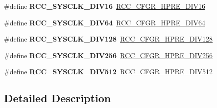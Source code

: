 \begin{DoxyCompactItemize}
\#define {\bfseries R\+C\+C\+\_\+\+S\+Y\+S\+C\+L\+K\+\_\+\+D\+I\+V16}~\hyperlink{group___peripheral___registers___bits___definition_ga3806da4f1afc9e5be0fca001c8c57815}{R\+C\+C\+\_\+\+C\+F\+G\+R\+\_\+\+H\+P\+R\+E\+\_\+\+D\+I\+V16}
\item 
\mbox{\label{group___r_c_c___a_h_b___clock___source_ga73814b5a7ee000687ec8334637ca5b14}} 
\#define {\bfseries R\+C\+C\+\_\+\+S\+Y\+S\+C\+L\+K\+\_\+\+D\+I\+V64}~\hyperlink{group___peripheral___registers___bits___definition_ga1caeba8dc2b4c0bb11be600e983e3370}{R\+C\+C\+\_\+\+C\+F\+G\+R\+\_\+\+H\+P\+R\+E\+\_\+\+D\+I\+V64}
\item 
\mbox{\label{group___r_c_c___a_h_b___clock___source_ga43eddf4d4160df30548a714dce102ad8}} 
\#define {\bfseries R\+C\+C\+\_\+\+S\+Y\+S\+C\+L\+K\+\_\+\+D\+I\+V128}~\hyperlink{group___peripheral___registers___bits___definition_ga280da821f0da1bec1f4c0e132ddf8eab}{R\+C\+C\+\_\+\+C\+F\+G\+R\+\_\+\+H\+P\+R\+E\+\_\+\+D\+I\+V128}
\item 
\mbox{\label{group___r_c_c___a_h_b___clock___source_ga94956d6e9c3a78230bf660b838f987e2}} 
\#define {\bfseries R\+C\+C\+\_\+\+S\+Y\+S\+C\+L\+K\+\_\+\+D\+I\+V256}~\hyperlink{group___peripheral___registers___bits___definition_ga089930cedd5b2cb201e717438f29d25b}{R\+C\+C\+\_\+\+C\+F\+G\+R\+\_\+\+H\+P\+R\+E\+\_\+\+D\+I\+V256}
\item 
\mbox{\label{group___r_c_c___a_h_b___clock___source_gabe18a9d55c0858bbfe3db657fb64c76d}} 
\#define {\bfseries R\+C\+C\+\_\+\+S\+Y\+S\+C\+L\+K\+\_\+\+D\+I\+V512}~\hyperlink{group___peripheral___registers___bits___definition_gae5088dcbaefc55d4b6693e9b1e595ed0}{R\+C\+C\+\_\+\+C\+F\+G\+R\+\_\+\+H\+P\+R\+E\+\_\+\+D\+I\+V512}
\end{DoxyCompactItemize}


\subsection{Detailed Description}
